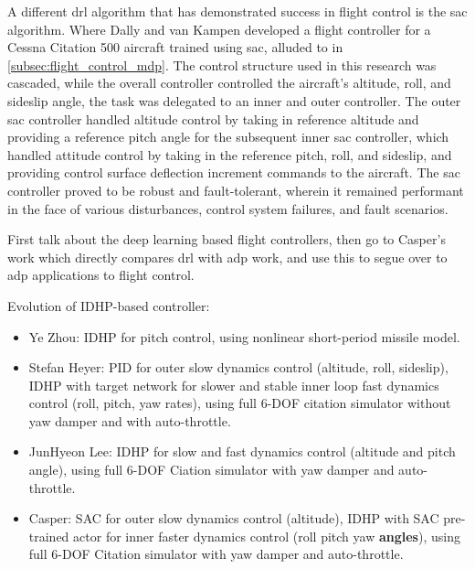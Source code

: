 \documentclass[../report.tex]{subfiles}
\begin{document}
A different \ac{drl} algorithm that has demonstrated success in flight control is the \ac{sac} algorithm. Where Dally and van Kampen developed a flight controller for a Cessna Citation 500 aircraft trained using \ac{sac}, alluded to in \autoref{subsec:flight_control_mdp}. The control structure used in this research was cascaded, while the overall controller controlled the aircraft's altitude, roll, and sideslip angle, the task was delegated to an inner and outer controller. The outer \ac{sac} controller handled altitude control by taking in reference altitude and providing a reference pitch angle for the subsequent inner \ac{sac} controller, which handled attitude control by taking in the reference pitch, roll, and sideslip, and providing control surface deflection increment commands to the aircraft. The \ac{sac} controller proved to be robust and fault-tolerant, wherein it remained performant in the face of various disturbances, control system failures, and fault scenarios.



First talk about the deep learning based flight controllers, then go to Casper's work which directly compares \ac{drl} with adp work, and use this to segue over to adp applications to flight control.

Evolution of IDHP-based controller:

\begin{itemize}
    \item Ye Zhou: IDHP for pitch control, using nonlinear short-period missile model.
    \item Stefan Heyer: PID for outer slow dynamics control (altitude, roll, sideslip), IDHP with target network for slower and stable inner loop fast dynamics control (roll, pitch, yaw rates), using full 6-DOF citation simulator without yaw damper and with auto-throttle.
    \item JunHyeon Lee: IDHP for slow and fast dynamics control (altitude and pitch angle), using full 6-DOF Ciation simulator with yaw damper and auto-throttle.
    \item Casper: SAC for outer slow dynamics control (altitude), IDHP with SAC pre-trained actor for inner faster dynamics control (roll pitch yaw \textbf{angles}), using full 6-DOF Citation simulator with yaw damper and auto-throttle.
\end{itemize}
\end{document}
